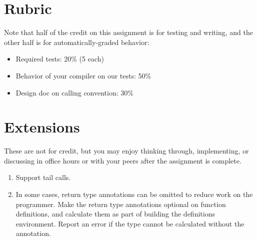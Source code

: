 \documentclass[10pt, oneside]{article}
\begin{document}
\section*{Rubric}

Note that half of the credit on this assignment is for testing and writing,
and the other half is for automatically-graded behavior:

\begin{itemize}
\item Required tests: 20\% (5 each)
\item Behavior of your compiler on our tests: 50\%
\item Design doc on calling convention: 30\%
\end{itemize}

\section*{Extensions}

These are not for credit, but you may enjoy thinking through, implementing,
or discussing in office hours or with your peers after the assignment is
complete.

\begin{enumerate}
\item Support tail calls.

\item In some cases, return type annotations can be omitted to reduce work on the
programmer. Make the return type annotations optional on function definitions,
and calculate them as part of building the definitions environment. Report an
error if the type cannot be calculated without the annotation.
\end{enumerate}
\end{document}
